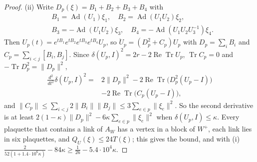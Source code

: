 \documentclass[11pt]{amsart}
\theoremstyle{definition}
\theoremstyle{remark}
\numberwithin{equation}{section}
\newcommand{\Tr}{\operatorname{Tr}}
\newcommand{\ReTr}{\operatorname{Re}\operatorname{Tr}}
\begin{document}
\begin{proof}
(ii) Write $D_p(\xi)=B_1+B_2+B_3+B_4$ with
\[
\begin{split}
&B_1=\operatorname{Ad}(U_1)\xi_1,\quad B_2=\operatorname{Ad}(U_1U_2)\xi_2,\\
&B_3=-\operatorname{Ad}(U_1U_2)\xi_3,\quad B_4=-\operatorname{Ad}(U_1U_2
U_3^{-1})\xi_4 .
\end{split}
\]
Then $U_p(t)=e^{tB_1}e^{tB_2}e^{tB_3}e^{tB_4}U_p$, so
$\ddot U_p=(D_p^2+C_p)U_p$ with $D_p=\sum_iB_i$ and $C_p=\sum_{i<j}[B_i,
B_j]$. Since $\delta(U_p,I)^2=2r-2\ReTr U_p$, $\Tr C_p=0$ and $-\Tr D_p^2=
\lVert D_p\rVert^2$,
\[
\begin{split}
\frac{d^2}{dt^2}\delta(U_p,I)^2={}&2\lVert D_p\rVert^2-2\ReTr\bigl(D_p^2
(U_p-I)\bigr)\\
&-2\ReTr\bigl(C_p(U_p-I)\bigr),
\end{split}
\]
and $\lVert C_p\rVert\le\sum_{i<j}2\lVert B_i\rVert\lVert B_j\rVert\le3
\sum_{e\in p}\lVert\xi_e\rVert^2$. So the second derivative is at least
$2(1-\kappa)\lVert D_p\rVert^2-6\kappa\sum_{e\in p}\lVert\xi_e\rVert^2$
when $\delta(U_p,I)\le\kappa$. Every plaquette that contains a link of $A_W$
has a vertex in a block of $W^+$, each link lies in six plaquettes, and
$Q_U(\xi)\le24T(\xi)$; this gives the bound, and with (i)
$\frac2{52(1+1.4\cdot10^6\kappa)}-84\kappa\ge\frac1{26}-5.4\cdot10^4
\kappa$.


\end{proof}
\end{document}

